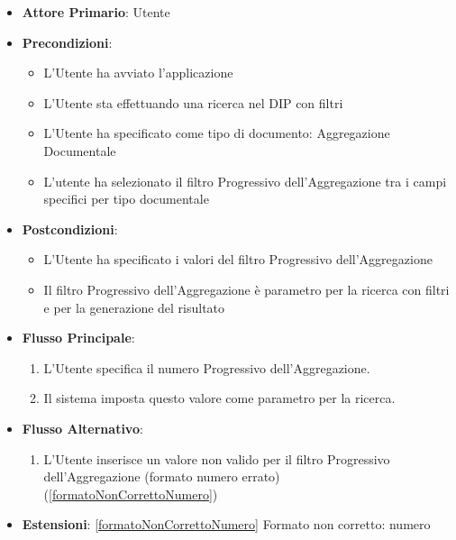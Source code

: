 \begin{itemize}
      \item \textbf{Attore Primario}: Utente
      \item \textbf{Precondizioni}: 
      \begin{itemize}
            \item L'Utente ha avviato l'applicazione
            \item L'Utente sta effettuando una ricerca nel DIP con filtri
            \item L'Utente ha specificato come tipo di documento: Aggregazione Documentale
            \item L'utente ha selezionato il filtro Progressivo dell'Aggregazione tra i campi specifici per tipo documentale
      \end{itemize}
      \item \textbf{Postcondizioni}: 
      \begin{itemize}
            \item L'Utente ha specificato i valori del filtro Progressivo dell'Aggregazione
            \item Il filtro Progressivo dell'Aggregazione è parametro per la ricerca con filtri e per la generazione del risultato
      \end{itemize}
      \item \textbf{Flusso Principale}:
      \begin{enumerate}
            \item L'Utente specifica il numero Progressivo dell'Aggregazione.
            \item Il sistema imposta questo valore come parametro per la ricerca.
      \end{enumerate}
      \item \textbf{Flusso Alternativo}:
      \begin{enumerate}
            \item L'Utente inserisce un valore non valido per il filtro Progressivo dell'Aggregazione (formato numero errato) (\ref{formatoNonCorrettoNumero})
      \end{enumerate}
      \item \textbf{Estensioni}: \ref{formatoNonCorrettoNumero} Formato non corretto: numero
\end{itemize}


